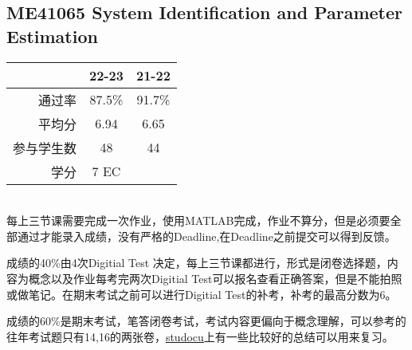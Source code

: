 \subsection{ME41065 System Identification and Parameter Estimation}
\begin{minipage}{0.45\textwidth}
\centering
{}
\end{minipage}%
\begin{minipage}{0.45\textwidth}
\raggedleft
\begin{tabular}{r|c|c}
\textbf{ } & \textbf{22-23} & \textbf{21-22}\\ \hline
通过率 & 87.5\% & 91.7\% \\ 
平均分 & 6.94 & 6.65\\ 
参与学生数 & 48 &44\\
学分 & 7 EC&\\
\end{tabular}
\end{minipage}\\

每上三节课需要完成一次作业，使用MATLAB完成，作业不算分，但是必须要全部通过才能录入成绩，没有严格的Deadline,在Deadline之前提交可以得到反馈。

成绩的40\%由4次Digitial Test 决定，每上三节课都进行，形式是闭卷选择题，内容为概念以及作业每考完两次Digitial Test可以报名查看正确答案，但是不能拍照或做笔记。在期末考试之前可以进行Digitial Test的补考，补考的最高分数为6。

成绩的60\%是期末考试，笔答闭卷考试，考试内容更偏向于概念理解，可以参考的往年考试题只有14,16的两张卷，\href{https://www.studeersnel.nl/nl/home}{\uline{studocu}}上有一些比较好的总结可以用来复习。


